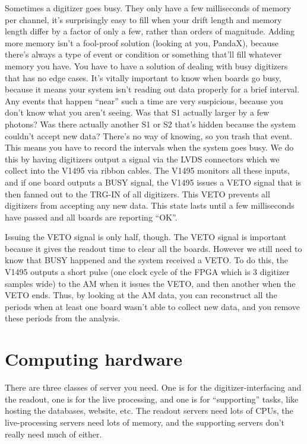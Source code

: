 Sometimes a digitizer goes busy.
They only have a few milliseconds of memory per channel, it's surprisingly easy to fill when your drift length and memory length differ by a factor of only a few, rather than orders of magnitude.
Adding more memory isn't a fool-proof solution (looking at you, PandaX), because there's always a type of event or condition or something that'll fill whatever memory you have.
You have to have a solution of dealing with busy digitizers that has no edge cases.
It's vitally important to know when boards go busy, because it means your system isn't reading out data properly for a brief interval.
Any events that happen ``near'' such a time are very suspicious, because you don't know what you aren't seeing.
Was that S1 actually larger by a few photons?
Was there actually another S1 or S2 that's hidden because the system couldn't accept new data?
There's no way of knowing, so you trash that event.
This means you have to record the intervals when the system goes busy.
We do this by having digitizers output a signal via the LVDS connectors which we collect into the V1495 via ribbon cables.
The V1495 monitors all these inputs, and if one board outputs a BUSY signal, the V1495 issues a VETO signal that is then fanned out to the TRG-IN of all digitizers.
This VETO prevents all digitizers from accepting any new data.
This state lasts until a few milliseconds have passed and all boards are reporting ``OK''.

Issuing the VETO signal is only half, though.
The VETO signal is important because it gives the readout time to clear all the boards.
However we still need to know that BUSY happened and the system received a VETO.
To do this, the V1495 outputs a short pulse (one clock cycle of the FPGA which is 3 digitizer samples wide) to the AM when it issues the VETO, and then another when the VETO ends.
Thus, by looking at the AM data, you can reconstruct all the periods when at least one board wasn't able to collect new data, and you remove these periods from the analysis.

\section{Computing hardware}

There are three classes of server you need.
One is for the digitizer-interfacing and the readout, one is for the live processing, and one is for ``supporting'' tasks, like hosting the databases, website, etc.
The readout servers need lots of CPUs, the live-processing servers need lots of memory, and the supporting servers don't really need much of either.

